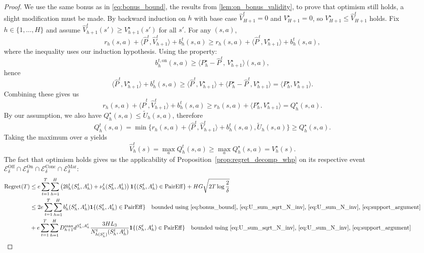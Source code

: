 \documentclass[twoside]{article}
\newcommand{\on}{\mathrm{on}} %
\newcommand{\bont}{b_h^{t,\on}} %
\newcommand{\highq}{\widetilde{U}} %
\begin{document}
\begin{proof}
We use the same bonus as in \eqref{eq:bonus_bound}, the results from \ref{lem:on_bonus_validity}, to prove that optimism still holds, a slight modification must be made. By backward induction on $h$ with base case $\widehat{V}_{H+1}^t =  0$ and $V_{H+1}^\star =  0$, so $V_{H+1}^\star\le \widehat{V}_{H+1}^t$ holds. Fix $h\in\{1,\dots,H\}$ and assume $\widehat{V}_{h+1}^t(s')\ge V_{h+1}^\star(s')$ for all $s'$. For any $(s,a)$,
\[
 r_h(s,a)+\langle \widehat{P}^{t}, \widehat{V}_{h+1}^t\rangle + b_h^t(s,a)
\ge r_h(s,a)+\langle \widehat{P}^{t}, V_{h+1}^\star\rangle + b_h^t(s,a),
\]
where the inequality uses our induction hypothesis. Using the property:
\[
\bont(s,a) \ge \bigl\langle P_h^\star-\widehat{P}^{t},\,V_{h+1}^\star\bigr\rangle(s,a),
\]
hence
\[
\langle \widehat{P}^{t}, V_{h+1}^\star\rangle + b_h^t(s,a)
\ge \langle \widehat{P}^{t}, V_{h+1}^\star\rangle + \langle P_h^\star-\widehat{P}^{t}, V_{h+1}^\star\rangle
= \langle P_h^\star, V_{h+1}^\star\rangle.
\]
Combining these gives us 
\[
 r_h(s,a)+\langle \widehat{P}^{t}, \widehat{V}_{h+1}^t\rangle + b_h^t(s,a) \ge r_h(s,a)+\langle P_h^\star, V_{h+1}^\star\rangle = Q_h^\star(s,a).
\]
By our assumption, we also have $Q_h^\star(s,a)\le \highq_h(s,a)$, therefore
\[
Q_h^t(s,a)=\min\{ r_h(s,a)+\langle \widehat{P}^{t}, \widehat{V}_{h+1}^t\rangle + b_h^t(s,a),\highq_h(s,a)\}\ge Q_h^\star(s,a).
\]
Taking the maximum over $a$ yields
\[
\widehat{V}_h^t(s)=\max_a Q_h^t(s,a)\ge \max_a Q_h^\star(s,a)=V_h^\star(s).
\]
The fact that optimism holds gives us the applicability of Proposition~\ref{prop:regret_decomp_whp} on its respective event \(\mathcal{E}^{\mathrm{Off}}_\delta\cap \mathcal{E}^{\mathrm{On}}_\delta \cap \mathcal{E}^{\mathrm{Conc}}_\delta \cap \mathcal{E}^{\mathrm{Mar}}_\delta \):
\begin{align*}
    \mathrm{Regret}(T) & \leq e\sum_{t=1}^{T}\sum_{h=1}^{H} \left(2b_h^{t}(S_h^t,A_h^t)+ \nu_h^{t}(S_h^t,A_h^t)\right)\mathbf{1}\{(S_h^t,A_h^t)\in\mathrm{PairEff}\} +HG\sqrt{2T\log \frac{2}{\delta}}\\
    & \le 2e\sum_{t=1}^{T}\sum_{h=1}^{H} b_h^{t}(S_h^t,A_h^t)\mathbf{1}\{(S_h^t,A_h^t)\in\mathrm{PairEff}\}\quad\text{bounded using \eqref{eq:bonus_bound}, \eqref{eq:U_sum_sqrt_N_inv}, \eqref{eq:U_sum_N_inv}, \eqref{eq:support_argument}}\\
    &+e\sum_{t=1}^{T}\sum_{h=1}^{H}D_{h+1}^{\max} d^{S_h^t,A_h^t}
    \frac{3 H L_3}
    {N_{h(S_h^t)}^t(S_h^t,A_h^t)}\mathbf{1}\{(S_h^t,A_h^t)\in\mathrm{PairEff}\}\quad\text{bounded using \eqref{eq:U_sum_sqrt_N_inv}, \eqref{eq:U_sum_N_inv}, \eqref{eq:support_argument}}\\

\end{align*}
\end{proof}
\end{document}
